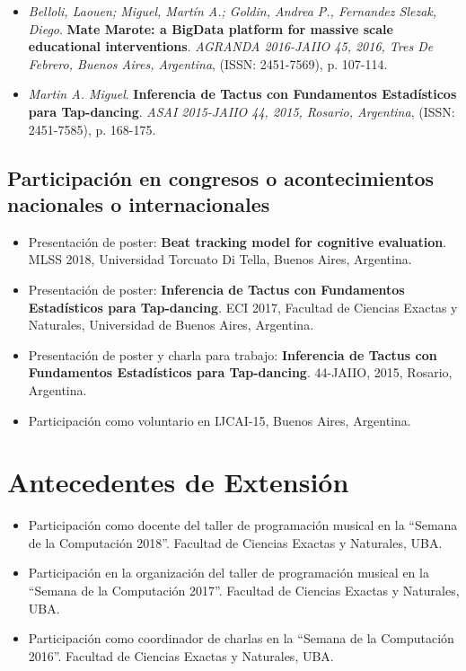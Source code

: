\documentclass[a4paper,10pt]{article}
\begin{document}
\begin{itemize}
    \item 
\emph{Belloli, Laouen; Miguel, Martín A.; Goldin, Andrea P., Fernandez Slezak,
        Diego}.
\textbf{Mate Marote: a BigData platform for massive scale educational
        interventions}.
        \emph{AGRANDA 2016-JAIIO 45, 2016, Tres De Febrero, Buenos Aires,
        Argentina}, (ISSN: 2451-7569), p. 107-114.
    \item 
\emph{Martin A. Miguel}.
\textbf{Inferencia de Tactus con Fundamentos Estadísticos para Tap-dancing}.
        \emph{ASAI 2015-JAIIO 44, 2015, Rosario, Argentina}, (ISSN: 2451-7585),
        p. 168-175.
\end{itemize}

\subsection{Participación en congresos o acontecimientos nacionales o
internacionales}

\begin{itemize}
    \item Presentación de poster:
        \textbf{Beat tracking model for cognitive evaluation}.
        MLSS 2018, Universidad Torcuato Di Tella, Buenos Aires, Argentina.
    \item Presentación de poster: \textbf{Inferencia de Tactus con Fundamentos Estadísticos para
Tap-dancing}.
    ECI 2017, Facultad de Ciencias Exactas y Naturales, Universidad de Buenos
        Aires, Argentina.
    \item Presentación de poster y charla para trabajo:
\textbf{Inferencia de Tactus con Fundamentos Estadísticos para
Tap-dancing}.
        44-JAIIO, 2015, Rosario, Argentina.
    \item Participación como voluntario en IJCAI-15, Buenos Aires, Argentina.
\end{itemize}

\section{Antecedentes de Extensión}

\begin{itemize}
    \item Participación como docente del taller de programación musical en la
        “Semana de la Computación 2018”.
        Facultad de Ciencias Exactas y Naturales, UBA.
    \item Participación en la organización del taller de programación musical
        en la “Semana de la Computación 2017”. Facultad de Ciencias Exactas y
        Naturales, UBA. 
    \item Participación como coordinador de charlas en la “Semana de la
        Computación 2016”. Facultad de Ciencias Exactas y Naturales, UBA. 
\end{itemize}
\end{document}
